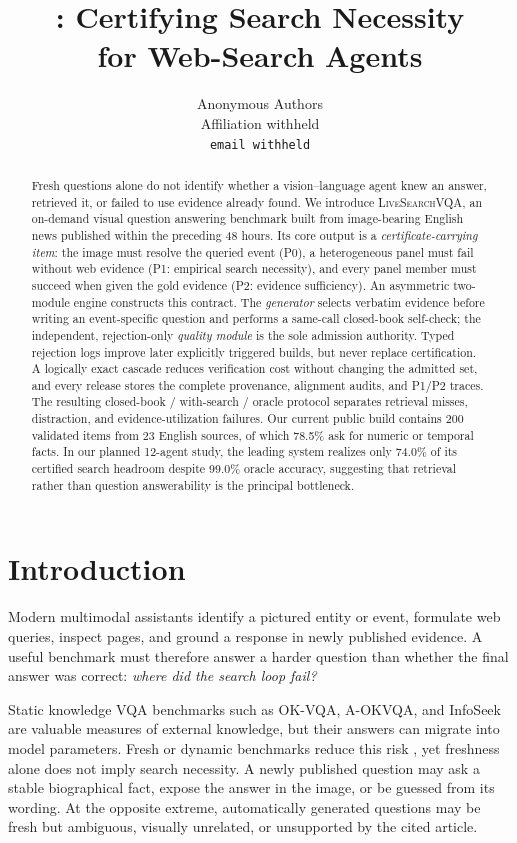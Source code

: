 \documentclass{article}
\title{\bench: Certifying Search Necessity\\
for Web-Search Agents}
\author{Anonymous Authors\\Affiliation withheld\\\texttt{email withheld}}
\date{}
\newcommand{\bench}{\textsc{LiveSearchVQA}}
\newcommand{\placeholder}[1]{\textcolor{blue!65!black}{#1}}
\begin{document}
\maketitle

\begin{abstract}
Fresh questions alone do not identify whether a vision--language agent knew
an answer, retrieved it, or failed to use evidence already found.
We introduce \bench{}, an on-demand visual question answering benchmark built
from image-bearing English news published within the preceding 48 hours.
Its core output is a \emph{certificate-carrying item}: the image must resolve
the queried event (P0), a heterogeneous panel must fail without web evidence
(P1: empirical search necessity), and every panel member must succeed when
given the gold evidence (P2: evidence sufficiency).
An asymmetric two-module engine constructs this contract.
The \emph{generator} selects verbatim evidence before writing an
event-specific question and performs a same-call closed-book self-check;
the independent, rejection-only \emph{quality module} is the sole admission
authority.
Typed rejection logs improve later explicitly triggered builds, but never
replace certification.
A logically exact cascade reduces verification cost without changing the
admitted set, and every release stores the complete provenance, alignment
audits, and P1/P2 traces.
The resulting closed-book / with-search / oracle protocol separates retrieval
misses, distraction, and evidence-utilization failures.
Our current public build contains 200 validated items from 23 English
sources, of which 78.5\% ask for numeric or temporal facts.
In our planned 12-agent study, the leading system realizes only
\placeholder{74.0\%} of its certified search headroom despite
\placeholder{99.0\%} oracle accuracy, suggesting that retrieval rather than
question answerability is the principal bottleneck.
\end{abstract}

\section{Introduction}
\label{sec:intro}

Modern multimodal assistants identify a pictured entity or event, formulate
web queries, inspect pages, and ground a response in newly published evidence.
A useful benchmark must therefore answer a harder question than whether the
final answer was correct: \emph{where did the search loop fail?}

Static knowledge VQA benchmarks such as OK-VQA, A-OKVQA, and InfoSeek
\citep{okvqa,aokvqa,infoseek} are valuable measures of external knowledge,
but their answers can migrate into model parameters.
Fresh or dynamic benchmarks reduce this risk \citep{freshqa,dynvqa,livebench},
yet freshness alone does not imply search necessity.
A newly published question may ask a stable biographical fact, expose the
answer in the image, or be guessed from its wording.
At the opposite extreme, automatically generated questions may be fresh but
ambiguous, visually unrelated, or unsupported by the cited article.
\end{document}
